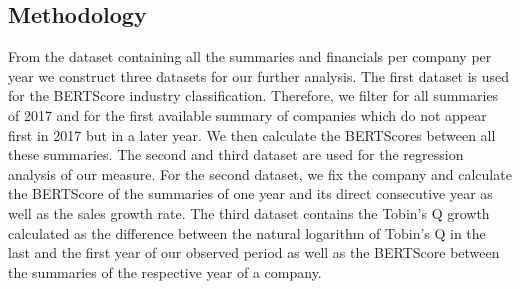 \documentclass[
]{article}
\begin{document}
\begin{table}[H]
\centering
\caption{Descriptive Statistics of Number of Words in Original Filings}
\centering
{}
\end{table}

\subsection{Methodology}\label{methodology}

From the dataset containing all the summaries and financials per company
per year we construct three datasets for our further analysis. The first
dataset is used for the BERTScore industry classification. Therefore, we
filter for all summaries of 2017 and for the first available summary of
companies which do not appear first in 2017 but in a later year. We then
calculate the BERTScores between all these summaries. The second and
third dataset are used for the regression analysis of our measure. For
the second dataset, we fix the company and calculate the BERTScore of
the summaries of one year and its direct consecutive year as well as the
sales growth rate. The third dataset contains the Tobin's Q growth
calculated as the difference between the natural logarithm of Tobin's Q
in the last and the first year of our observed period as well as the
BERTScore between the summaries of the respective year of a company.
\end{document}
